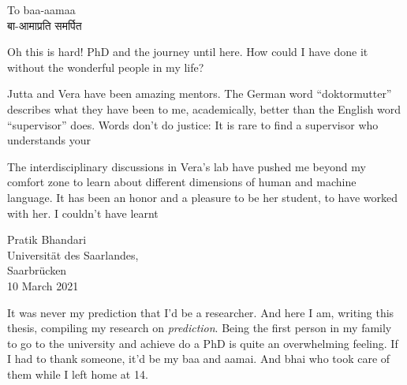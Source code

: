 \documentclass[a4paper, nobind]{templates/ociamthesis}
\begin{document}
\begin{romanpages}

\maketitle

\begin{dedication}
  To baa-aamaa\\
  बा-आमाप्रति समर्पित
\end{dedication}



\begin{acknowledgements}
 	Oh this is hard! PhD and the journey until here.
 How could I have done it without the wonderful people in my life?

 Jutta and Vera have been amazing mentors.
 The German word ``doktormutter'' describes what they have been to me, academically, better than the English word ``supervisor'' does.
 Words don't do justice:
 It is rare to find a supervisor who understands your

 The interdisciplinary discussions in Vera's lab have pushed me beyond my comfort zone to learn about different dimensions of human and machine language.
 It has been an honor and a pleasure to be her student, to have worked with her.
 I couldn't have learnt

 \begin{flushright}
 Pratik Bhandari \\
 Universität des Saarlandes,\\
 Saarbrücken \\
 10 March 2021
 \end{flushright}
\end{acknowledgements}





\begin{preface}
 	It was never my prediction that I'd be a researcher.
 And here I am, writing this thesis, compiling my research on \emph{prediction}.
 Being the first person in my family to go to the university and achieve do a PhD is quite an overwhelming feeling.
 If I had to thank someone, it'd be my baa and aamai.
 And bhai who took care of them while I left home at 14.


\end{preface}
\end{romanpages}
\end{document}
